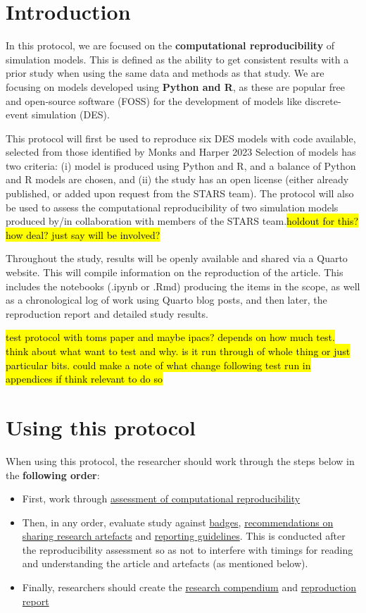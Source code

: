 \section{Introduction}

In this protocol, we are focused on the \textbf{computational reproducibility} of simulation models. This is defined as the ability to get consistent results with a prior study when using  the same data and methods as that study. We are focusing on models developed using \textbf{Python and R}, as these are popular free and open-source software (FOSS) for the development of models like discrete-event simulation (DES).\autocite{monks_computer_2023}

This protocol will first be used to reproduce six DES models with code available, selected from those identified by Monks and Harper 2023\autocite{monks_computer_2023} Selection of models has two criteria: (i) model is produced using Python and R, and a balance of Python and R models are chosen, and (ii) the study has an open license (either already published, or added upon request from the STARS team). The protocol will also be used to assess the computational reproducibility of two simulation models produced by/in collaboration with members of the STARS team.\hl{holdout for this? how deal? just say will be involved?}

Throughout the study, results will be openly available and shared via a Quarto website. This will compile information on the reproduction of the article. This includes the notebooks (.ipynb or .Rmd) producing the items in the scope, as well as a chronological log of work using Quarto blog posts, and then later, the reproduction report and detailed study results.

\hl{test protocol with toms paper and maybe ipacs? depends on how much test. think about what want to test and why. is it run through of whole thing or just particular bits. could make a note of what change following test run in appendices if think relevant to do so}

\vspace{2cm}
\section{Using this protocol}

When using this protocol, the researcher should work through the steps below in the \textbf{following order}:
\begin{itemize}
    \item First, work through \hyperref[sec:reproduce]{assessment of computational reproducibility}
    \item Then, in any order, evaluate study against \hyperref[sec:badges]{badges}, \hyperref[sec:artefacts]{recommendations on sharing research artefacts} and \hyperref[sec:reporting]{reporting guidelines}. This is conducted after the reproducibility assessment so as not to interfere with timings for reading and understanding the article and artefacts (as mentioned below).
    \item Finally, researchers should create the \hyperref[sec:compendium]{research compendium} and \hyperref[sec:report]{reproduction report}
\end{itemize}

